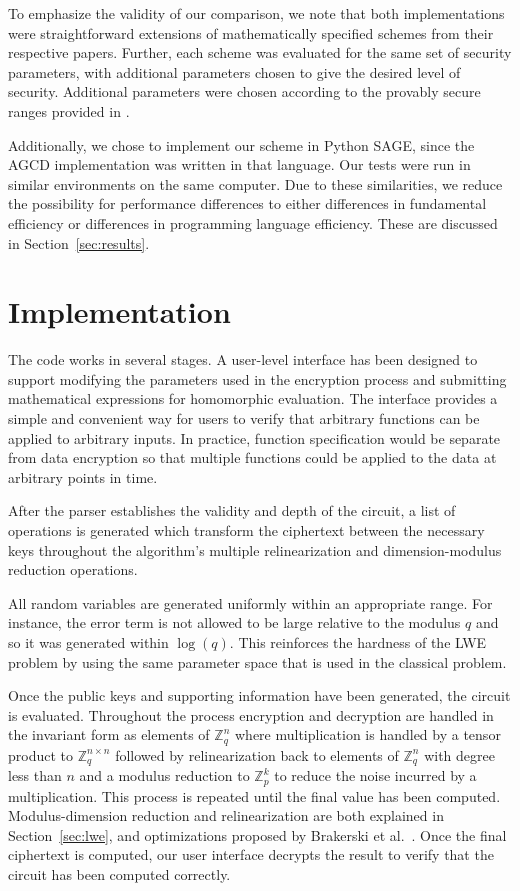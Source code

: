 \documentclass[letterpaper,twocolumn,10pt]{article}
\begin{document}
To emphasize the validity of our comparison, we note that both implementations were straightforward extensions of mathematically specified schemes from their respective papers. Further, each scheme was evaluated for the same set of security parameters, with additional parameters chosen to give the desired level of security. Additional parameters were chosen according to the provably secure ranges provided in \cite{StandardLWE, CNT}. 

Additionally, we chose to implement our scheme in Python SAGE, since the AGCD implementation was written in that language. Our tests were run in similar environments on the same computer. Due to these similarities, we reduce the possibility for performance differences to either differences in fundamental efficiency or differences in programming language efficiency. These are discussed in Section~\ref{sec:results}.


\section{Implementation}
The code works in several stages. A user-level interface has been designed to support modifying the parameters used in the encryption process and submitting mathematical expressions for homomorphic evaluation. The interface provides a simple and convenient way for users to verify that arbitrary functions can be applied to arbitrary inputs. In practice, function specification would be separate from data encryption so that multiple functions could be applied to the data at arbitrary points in time.

After the parser establishes the validity and depth of the circuit, a list of operations is generated which transform the ciphertext between the necessary keys throughout the algorithm's multiple relinearization and dimension-modulus reduction operations.

All random variables are generated uniformly within an appropriate range. For instance, the error term is not allowed to be large relative to the modulus $q$ and so it was generated within $\log(q)$. This reinforces the hardness of the LWE problem by using the same parameter space that is used in the classical problem.

Once the public keys and supporting information have been generated, the circuit is evaluated. Throughout the process encryption and decryption are handled in the invariant form as elements of $\mathbb{Z}^n_q$ where multiplication is handled by a tensor product to $\mathbb{Z}^{n\times n}_q$ followed by relinearization back to elements of $\mathbb{Z}^n_q$ with degree less than $n$ and a modulus reduction to $\mathbb{Z}^k_p$ to reduce the noise incurred by a multiplication. This process is repeated until the final value has been computed. Modulus-dimension reduction and relinearization are both explained in Section~\ref{sec:lwe}, and optimizations proposed by Brakerski et al.~\cite{StandardLWE}. Once the final ciphertext is computed, our user interface decrypts the result to verify that the circuit has been computed correctly.
\end{document}
